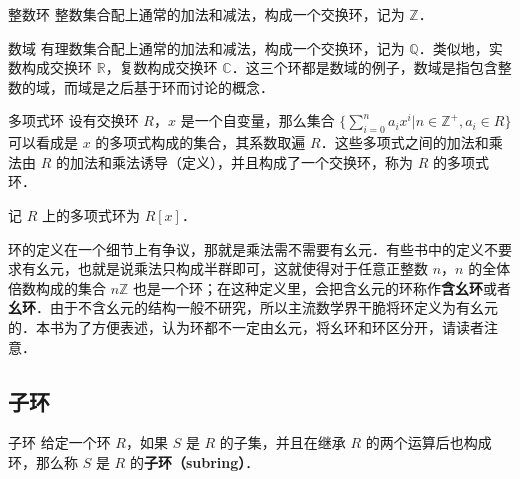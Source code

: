 \begin{example}{整数环}
整数集合配上通常的加法和减法，构成一个交换环，记为 $\mathbb{Z}$．
\end{example}

\begin{example}{数域}
有理数集合配上通常的加法和减法，构成一个交换环，记为 $\mathbb{Q}$．类似地，实数构成交换环 $\mathbb{R}$，复数构成交换环 $\mathbb{C}$．这三个环都是数域的例子，数域是指包含整数的域，而域是之后基于环而讨论的概念．
\end{example}

\begin{example}{多项式环}
设有交换环 $R$，$x$ 是一个自变量，那么集合 $\{\sum\limits_{i=0}^n a_ix^i|n\in\mathbb{Z}^+, a_i\in R\}$ 可以看成是 $x$ 的多项式构成的集合，其系数取遍 $R$．这些多项式之间的加法和乘法由 $R$ 的加法和乘法诱导（定义），并且构成了一个交换环，称为 $R$ 的多项式环．

记 $R$ 上的多项式环为 $R[x]$．
\end{example}

环的定义在一个细节上有争议，那就是乘法需不需要有幺元．有些书中的定义不要求有幺元，也就是说乘法只构成半群即可，这就使得对于任意正整数 $n$，$n$ 的全体倍数构成的集合 $n\mathbb{Z}$ 也是一个环；在这种定义里，会把含幺元的环称作\textbf{含幺环}或者\textbf{幺环}．由于不含幺元的结构一般不研究，所以主流数学界干脆将环定义为有幺元的．本书为了方便表述，认为环都不一定由幺元，将幺环和环区分开，请读者注意．

\subsection{子环}

\begin{definition}{子环}
给定一个环 $R$，如果 $S$ 是 $R$ 的子集，并且在继承 $R$ 的两个运算后也构成环，那么称 $S$ 是 $R$ 的\textbf{子环（subring）}．
\end{definition}



